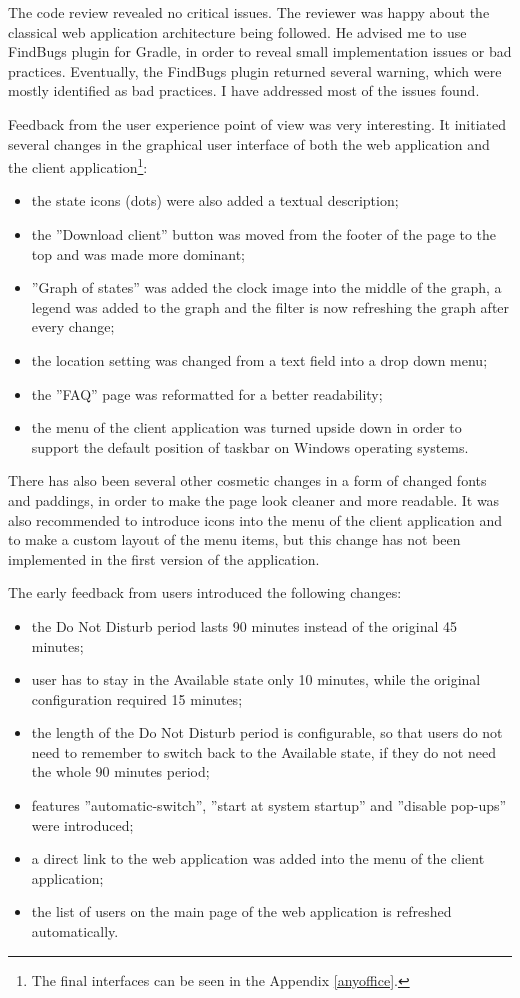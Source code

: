 \documentclass[11pt,singleside]{myfithesis2}
\begin{document}
The code review revealed no critical issues. The reviewer was happy about the classical web application architecture being followed. He advised me to use FindBugs plugin for Gradle, in order to reveal small implementation issues or bad practices. Eventually, the FindBugs plugin returned several warning, which were mostly identified as bad practices. I have addressed most of the issues found.

Feedback from the user experience point of view was very interesting. It initiated several changes in the graphical user interface of both the web application and the client application\footnote{The final interfaces can be seen in the Appendix \ref{anyoffice}.}:
\begin{itemize}
	\item the state icons (dots) were also added a textual description;
	\item the ''Download client'' button was moved from the footer of the page to the top and was made more dominant;
	\item ''Graph of states'' was added the clock image into the middle of the graph, a legend was added to the graph and the filter is now refreshing the graph after every change;
	\item the location setting was changed from a text field into a drop down menu;
	\item the ''FAQ'' page was reformatted for a better readability;
	\item the menu of the client application was turned upside down in order to support the default position of taskbar on Windows operating systems.
\end{itemize}
There has also been several other cosmetic changes in a form of changed fonts and paddings, in order to make the page look cleaner and more readable. It was also recommended to introduce icons into the menu of the client application and to make a custom layout of the menu items, but this change has not been implemented in the first version of the application.

The early feedback from users introduced the following changes:
\begin{itemize}
	\item the Do Not Disturb period lasts 90 minutes instead of the original 45 minutes;
	\item user has to stay in the Available state only 10 minutes, while the original configuration required 15 minutes;
	\item the length of the Do Not Disturb period is configurable, so that users do not need to remember to switch back to the Available state, if they do not need the whole 90 minutes period;
	\item features ''automatic-switch'', ''start at system startup'' and ''disable pop-ups''  were introduced;
	\item a direct link to the web application was added into the menu of the client application;
	\item the list of users on the main page of the web application is refreshed automatically.
\end{itemize}
\end{document}
